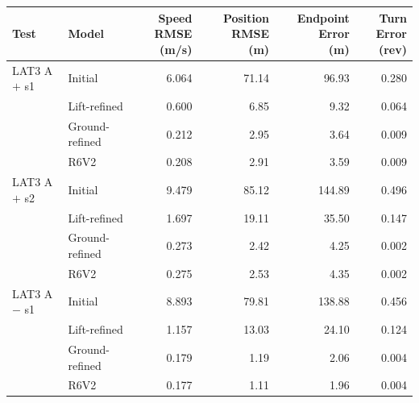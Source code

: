 \begin{center}
\small
\setlength{\tabcolsep}{5pt}
\begin{tabular}{@{}llrrrr@{}}
\toprule
Test & Model & \shortstack{Speed RMSE\\(m/s)} & \shortstack{Position RMSE\\(m)} & \shortstack{Endpoint Error\\(m)} & \shortstack{Turn Error\\(rev)} \\
\midrule
LAT3 A$+$ s1 & Initial & 6.064 & 71.14 & 96.93 & 0.280 \\
 & Lift-refined & 0.600 & 6.85 & 9.32 & 0.064 \\
 & Ground-refined & 0.212 & 2.95 & 3.64 & 0.009 \\
 & R6V2 & 0.208 & 2.91 & 3.59 & 0.009 \\
\addlinespace[2pt]
LAT3 A$+$ s2 & Initial & 9.479 & 85.12 & 144.89 & 0.496 \\
 & Lift-refined & 1.697 & 19.11 & 35.50 & 0.147 \\
 & Ground-refined & 0.273 & 2.42 & 4.25 & 0.002 \\
 & R6V2 & 0.275 & 2.53 & 4.35 & 0.002 \\
\addlinespace[2pt]
LAT3 A$-$ s1 & Initial & 8.893 & 79.81 & 138.88 & 0.456 \\
 & Lift-refined & 1.157 & 13.03 & 24.10 & 0.124 \\
 & Ground-refined & 0.179 & 1.19 & 2.06 & 0.004 \\
 & R6V2 & 0.177 & 1.11 & 1.96 & 0.004 \\
\bottomrule
\end{tabular}
\label{tab:additional_lat3}
\end{center}
